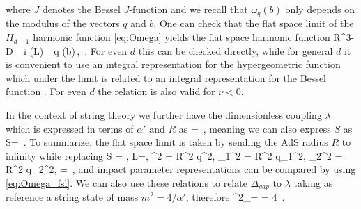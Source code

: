 where $J$ denotes the Bessel $J$-function and we recall that $\omega_{q} (b)$ only depends on the modulus of the vectors $q$ and $b$.
One can check that the flat space limit of the $H_{d-1}$ harmonic function \eqref{eq:Omega} yields the flat space harmonic function
\beq
R^{3-D} \Omega_{i \nu} (L) \to \omega_{q} (b)\,, \qquad \nu {}\,.
\label{eq:Omega_fsl}
\eeq
For even $d$ this can be checked directly, while for general $d$ it is convenient to use an integral representation for the hypergeometric function which under the limit is related to an integral representation for the Bessel function \cite{Carmi:2018qzm}.
For even $d$ the relation is also valid for $\nu < 0$.

In the context of string theory we further have the dimensionless coupling $\lambda$ which is expressed in terms of $\alpha'$ and $R$ as
\beq
\sqrt{\l} = \,,
\eeq
meaning we can also express $S$ as
\beq
S= \,.
\label{eq:Stos}
\eeq
To summarize, the flat space limit is taken by
sending the AdS radius $R$ to infinity while replacing
\beq
S = , \quad L=, \quad	\nu^2 = R^2 q^2, \quad \nu_1^2 = R^2 q_1^2, \quad  \nu_2^2 = R^2 q_2^2, \quad \sqrt{\l} =   \,,
		\label{eq:flat_space_limit}
\eeq
and impact parameter representations can be compared by using \eqref{eq:Omega_fsl}.
We can also use these relations to relate $\Delta_{gap}$ to $\lambda$ taking as reference a string state of mass $m^2=4/\alpha'$, therefore
\beq
\Delta^2_{}= = 4 \sqrt{\lambda}\,.
\eeq

